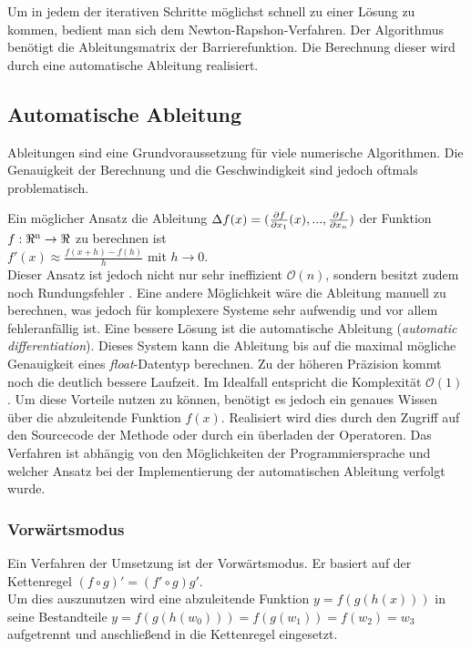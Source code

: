 \documentclass{like}
\begin{document}
Um in jedem der iterativen Schritte möglichst schnell zu einer Lösung zu kommen, bedient man sich dem Newton-Rapshon-Verfahren. 
Der Algorithmus benötigt die Ableitungsmatrix der Barrierefunktion. Die Berechnung dieser wird durch eine automatische Ableitung realisiert.

\subsection{Automatische Ableitung} 

Ableitungen sind eine Grundvoraussetzung für viele numerische Algorithmen. Die Genauigkeit der Berechnung und die Geschwindigkeit sind jedoch oftmals problematisch.

Ein möglicher Ansatz die Ableitung $\Delta{\tiny } f(x) = (\frac{\partial f}{\partial x_1} (x), ..., \frac{\partial f}{\partial x_n})$ der Funktion $f:\Re \textsuperscript{n} \rightarrow \Re $ zu berechnen ist \\
$f'(x) \approx \frac{f(x+h) - f(h)}{h}$ mit $ h \rightarrow 0 $. \\
Dieser Ansatz ist jedoch nicht nur sehr ineffizient $\mathcal{O}(n)$, sondern besitzt zudem noch Rundungsfehler \cite{julDiff}.
Eine andere Möglichkeit wäre die Ableitung manuell zu berechnen, was jedoch für komplexere Systeme sehr aufwendig und vor allem fehleranfällig ist. Eine bessere Lösung ist die automatische Ableitung (\emph{automatic differentiation}). 
Dieses System kann die Ableitung bis auf die maximal mögliche Genauigkeit eines \textit{float}-Datentyp berechnen. Zu der höheren Präzision kommt noch die deutlich bessere Laufzeit. Im Idealfall entspricht die Komplexität $\mathcal{O}(1)$ \cite{julDiff}. Um diese Vorteile nutzen zu können, benötigt es jedoch ein genaues Wissen über die abzuleitende Funktion \(f(x)\). Realisiert wird dies durch den Zugriff auf den Sourcecode der Methode oder durch ein überladen der Operatoren. Das Verfahren ist abhängig von den Möglichkeiten der Programmiersprache und welcher Ansatz bei der Implementierung der automatischen Ableitung verfolgt wurde. 


\subsubsection*{Vorwärtsmodus}
Ein Verfahren der Umsetzung ist der Vorwärtsmodus. Er basiert auf der Kettenregel $(f \circ g)' = (f' \circ g)g'$. \\
Um dies auszunutzen wird eine abzuleitende Funktion $ y = f(g(h(x)))$ in seine Bestandteile $y = f(g(h(w_0))) = f(g(w_1)) = f(w_2) = w_3$ aufgetrennt und anschließend in die Kettenregel eingesetzt. 
\end{document}
